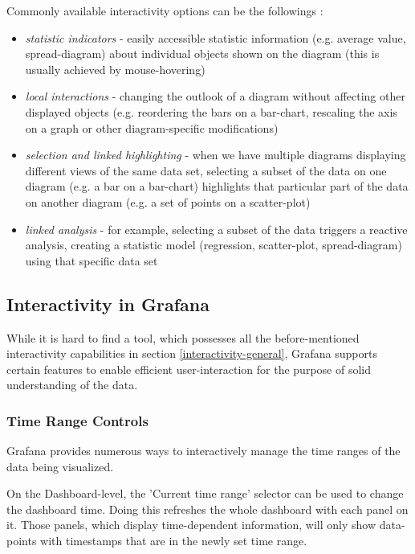 Commonly available interactivity options can be the followings \cite{visual-analysis}:
\begin{itemize}
	\item \emph{statistic indicators} - easily accessible statistic information (e.g. average value, spread-diagram) about individual objects shown on the diagram (this is usually achieved by mouse-hovering)
	\item \emph{local interactions} - changing the outlook of a diagram without affecting other displayed objects (e.g. reordering the bars on a bar-chart, rescaling the axis on a graph or other diagram-specific modifications)
	\item \emph{selection and linked highlighting} - when we have multiple diagrams displaying different views of the same data set, selecting a subset of the data on one diagram (e.g. a bar on a bar-chart) highlights that particular part of the data on another diagram (e.g. a set of points on a scatter-plot)
	\item \emph{linked analysis} - for example, selecting a subset of the data triggers a reactive analysis, creating a statistic model (regression, scatter-plot, spread-diagram) using that specific data set
\end{itemize}

\subsection{Interactivity in Grafana}

While it is hard to find a tool, which possesses all the before-mentioned interactivity capabilities in section \ref{interactivity-general}, Grafana supports certain features to enable efficient user-interaction for the purpose of solid understanding of the data.


\subsubsection{Time Range Controls} \label{grafana-time-range-controls}

Grafana provides numerous ways to interactively manage the time ranges of the data being visualized. \cite{grafana-time-range-controls}

On the Dashboard-level, the 'Current time range' selector can be used to change the dashboard time. Doing this refreshes the whole dashboard with each panel on it. Those panels, which display time-dependent information, will only show data-points with timestamps that are in the newly set time range.

